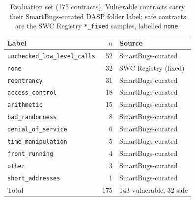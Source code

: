 \begin{table}[t]\centering\small
\caption{Evaluation set (175 contracts). Vulnerable contracts carry their SmartBugs-curated DASP folder label; safe contracts are the SWC Registry \texttt{*\_fixed} samples, labelled \texttt{none}.}\label{tab:data}
\begin{tabular}{lrl}\toprule
Label & $n$ & Source\\\midrule
\texttt{unchecked\_low\_level\_calls} & 52 & SmartBugs-curated\\
\texttt{none} & 32 & SWC Registry (fixed)\\
\texttt{reentrancy} & 31 & SmartBugs-curated\\
\texttt{access\_control} & 18 & SmartBugs-curated\\
\texttt{arithmetic} & 15 & SmartBugs-curated\\
\texttt{bad\_randomness} & 8 & SmartBugs-curated\\
\texttt{denial\_of\_service} & 6 & SmartBugs-curated\\
\texttt{time\_manipulation} & 5 & SmartBugs-curated\\
\texttt{front\_running} & 4 & SmartBugs-curated\\
\texttt{other} & 3 & SmartBugs-curated\\
\texttt{short\_addresses} & 1 & SmartBugs-curated\\
\midrule
Total & 175 & 143 vulnerable, 32 safe\\
\bottomrule\end{tabular}\end{table}
